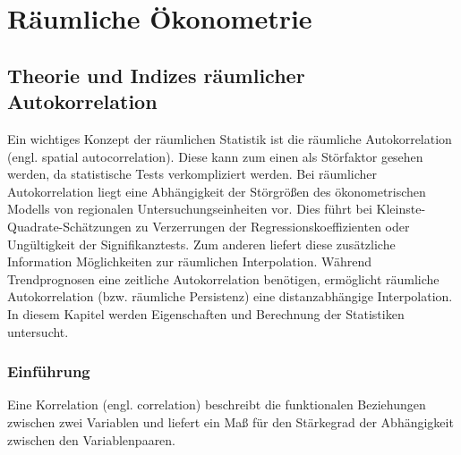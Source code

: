 \chapter{Räumliche Ökonometrie}

\section{Theorie und Indizes räumlicher Autokorrelation}

Ein wichtiges Konzept der räumlichen Statistik ist die räumliche Autokorrelation (engl. spatial autocorrelation).
Diese kann zum einen als Störfaktor gesehen werden, da statistische Tests verkompliziert werden. 
Bei räumlicher Autokorrelation liegt eine Abhängigkeit der Störgrößen des ökonometrischen Modells von regionalen 
Untersuchungseinheiten vor. Dies führt bei Kleinste-Quadrate-Schätzungen zu Verzerrungen der Regressionskoeffizienten 
oder Ungültigkeit der Signifikanztests. Zum anderen liefert diese zusätzliche Information Möglichkeiten 
zur räumlichen Interpolation. Während Trendprognosen eine zeitliche Autokorrelation benötigen, 
ermöglicht räumliche Autokorrelation (bzw. räumliche Persistenz) eine distanzabhängige Interpolation. 
In diesem Kapitel werden Eigenschaften und Berechnung der Statistiken untersucht.

\subsection{Einführung}

Eine Korrelation (engl. correlation) beschreibt die funktionalen Beziehungen zwischen zwei 
Variablen und liefert ein Maß für den Stärkegrad der Abhängigkeit zwischen den Variablenpaaren.

